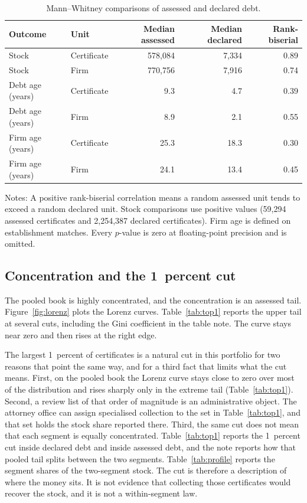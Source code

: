 \begin{table}[t]
\centering
\caption{Mann--Whitney comparisons of assessed and declared debt.}\label{tab:mw}
\begin{tabular}{llrrr}
\toprule
Outcome & Unit & Median assessed & Median declared & Rank-biserial \\
\midrule
Stock & Certificate & \brl{}578,084 & \brl{}7,334 & 0.89 \\
Stock & Firm & \brl{}770,756 & \brl{}7,916 & 0.74 \\
Debt age (years) & Certificate & 9.3 & 4.7 & 0.39 \\
Debt age (years) & Firm & 8.9 & 2.1 & 0.55 \\
Firm age (years) & Certificate & 25.3 & 18.3 & 0.30 \\
Firm age (years) & Firm & 24.1 & 13.4 & 0.45 \\
\bottomrule
\end{tabular}

\vspace{0.4em}
\begin{minipage}{0.95\textwidth}
\footnotesize
Notes: A positive rank-biserial correlation means a random assessed unit tends to exceed a random declared unit.
Stock comparisons use positive values (59,294 assessed certificates and 2,254,387 declared certificates).
Firm age is defined on establishment matches.
Every $p$-value is zero at floating-point precision and is omitted.
\end{minipage}
\end{table}

\subsection{Concentration and the 1~percent cut}\label{sec:conc}

The pooled book is highly concentrated, and the concentration is an assessed tail.
Figure~\ref{fig:lorenz} plots the Lorenz curves.
Table~\ref{tab:top1} reports the upper tail at several cuts, including the Gini coefficient in the table note.
The curve stays near zero and then rises at the right edge.

The largest 1~percent of certificates is a natural cut in this portfolio for two reasons that point the same way, and for a third fact that limits what the cut means.
First, on the pooled book the Lorenz curve stays close to zero over most of the distribution and rises sharply only in the extreme tail (Table~\ref{tab:top1}).
Second, a review list of that order of magnitude is an administrative object.
The attorney office can assign specialised collection to the set in Table~\ref{tab:top1}, and that set holds the stock share reported there.
Third, the same cut does not mean that each segment is equally concentrated.
Table~\ref{tab:top1} reports the 1~percent cut inside declared debt and inside assessed debt, and the note reports how that pooled tail splits between the two segments.
Table~\ref{tab:profile} reports the segment shares of the two-segment stock.
The cut is therefore a description of where the money sits.
It is not evidence that collecting those certificates would recover the stock, and it is not a within-segment law.

